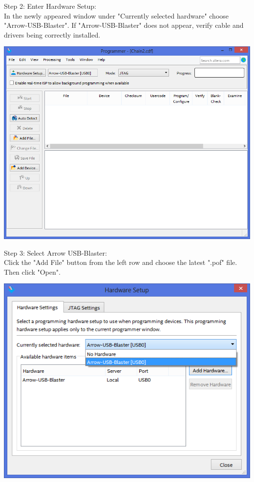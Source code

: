 \vspace{5mm}

\begin{minipage}{\linewidth}
Step 2: Enter Hardware Setup: \\
In the newly appeared window under "Currently selected
hardware" choose "Arrow-USB-Blaster".
If "Arrow-USB-Blaster" does not appear, verify cable and
drivers being correctly installed.
  \begin{center}
  \includegraphics[width=0.8\linewidth]{images/max10_02.png}
  \end{center}
\end{minipage}


\begin{minipage}{\linewidth}
Step 3: Select Arrow USB-Blaster: \\
Click the "Add File" button from the left row and choose the
latest ".pof" file. Then click "Open".
  \begin{center}
  \includegraphics[width=0.8\linewidth]{images/max10_03.png}
  \end{center}
\end{minipage}


